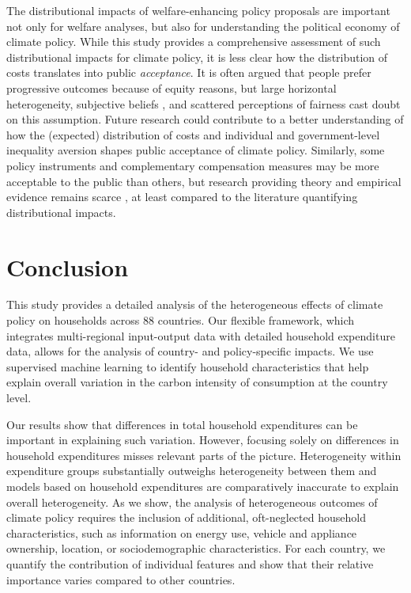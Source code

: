 \documentclass[12pt, a4paper]{article}
\begin{document}
The distributional impacts of welfare-enhancing policy proposals are important not only for welfare analyses, but also for understanding the political economy of climate policy. While this study provides a comprehensive assessment of such distributional impacts for climate policy, it is less clear how the distribution of costs translates into public \textit{acceptance}. It is often argued that people prefer progressive outcomes because of equity reasons, but large horizontal heterogeneity, subjective beliefs \autocite{Douenne.2020}, and scattered perceptions of fairness \autocite{MaestreAndres.2019,Povitkina.2021} cast doubt on this assumption. Future research could contribute to a better understanding of how the (expected) distribution of costs and individual and government-level inequality aversion shapes public acceptance of climate policy. Similarly, some policy instruments and complementary compensation measures may be more acceptable to the public than others, but research providing theory and empirical evidence remains scarce \autocite[e.g.,][]{Sommer.2022,MohammadzadehValencia.2024}, at least compared to the literature quantifying distributional impacts. 

\section{Conclusion} \label{sec:conclusion}

This study provides a detailed analysis of the heterogeneous effects of climate policy on households across 88 countries. Our flexible framework, which integrates multi-regional input-output data with detailed household expenditure data, allows for the analysis of country- and policy-specific impacts. We use supervised machine learning to identify household characteristics that help explain overall variation in the carbon intensity of consumption at the country level.

Our results show that differences in total household expenditures can be important in explaining such variation. However, focusing solely on differences in household expenditures misses relevant parts of the picture. Heterogeneity within expenditure groups substantially outweighs heterogeneity between them and models based on household expenditures are comparatively inaccurate to explain overall heterogeneity. As we show, the analysis of heterogeneous outcomes of climate policy requires the inclusion of additional, oft-neglected household characteristics, such as information on energy use, vehicle and appliance ownership, location, or sociodemographic characteristics. For each country, we quantify the contribution of individual features and show that their relative importance varies compared to other countries.
\end{document}
